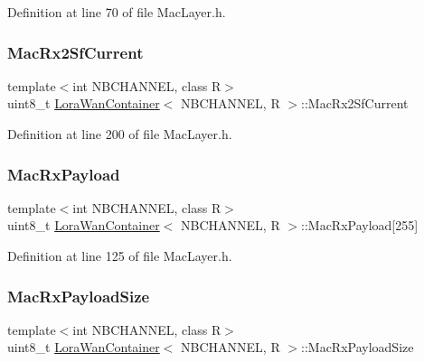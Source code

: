 Definition at line 70 of file Mac\+Layer.\+h.

\mbox{\label{class_lora_wan_container_a513daf6bfa05b4f3bac7b9c8184f41cd}} 
\subsubsection{\texorpdfstring{Mac\+Rx2\+Sf\+Current}{MacRx2SfCurrent}}
{\footnotesize\ttfamily template$<$int N\+B\+C\+H\+A\+N\+N\+EL, class R$>$ \\
uint8\+\_\+t \mbox{\hyperlink{class_lora_wan_container}{Lora\+Wan\+Container}}$<$ N\+B\+C\+H\+A\+N\+N\+EL, R $>$\+::Mac\+Rx2\+Sf\+Current\hspace{0.3cm}{\ttfamily [protected]}}



Definition at line 200 of file Mac\+Layer.\+h.

\mbox{\label{class_lora_wan_container_a1181f001c9b5ff0d95099e65c2a36f4d}} 
\subsubsection{\texorpdfstring{Mac\+Rx\+Payload}{MacRxPayload}}
{\footnotesize\ttfamily template$<$int N\+B\+C\+H\+A\+N\+N\+EL, class R$>$ \\
uint8\+\_\+t \mbox{\hyperlink{class_lora_wan_container}{Lora\+Wan\+Container}}$<$ N\+B\+C\+H\+A\+N\+N\+EL, R $>$\+::Mac\+Rx\+Payload\mbox{[}255\mbox{]}}



Definition at line 125 of file Mac\+Layer.\+h.

\mbox{\label{class_lora_wan_container_a481588e4fef130cf21d6be3a3812d776}} 
\subsubsection{\texorpdfstring{Mac\+Rx\+Payload\+Size}{MacRxPayloadSize}}
{\footnotesize\ttfamily template$<$int N\+B\+C\+H\+A\+N\+N\+EL, class R$>$ \\
uint8\+\_\+t \mbox{\hyperlink{class_lora_wan_container}{Lora\+Wan\+Container}}$<$ N\+B\+C\+H\+A\+N\+N\+EL, R $>$\+::Mac\+Rx\+Payload\+Size}



